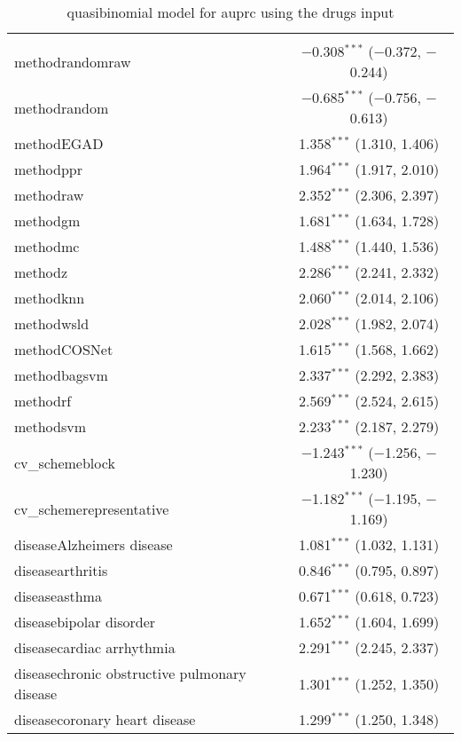 
\begin{table}[!htbp] \centering 
  \caption{quasibinomial model for auprc using the drugs input} 
  \label{} 
\begin{tabular}{@{\extracolsep{5pt}}lc} 
\\[-1.8ex]\hline 
\hline \\[-1.8ex] 
 methodrandomraw & $-$0.308$^{***}$ ($-$0.372, $-$0.244) \\ 
  methodrandom & $-$0.685$^{***}$ ($-$0.756, $-$0.613) \\ 
  methodEGAD & 1.358$^{***}$ (1.310, 1.406) \\ 
  methodppr & 1.964$^{***}$ (1.917, 2.010) \\ 
  methodraw & 2.352$^{***}$ (2.306, 2.397) \\ 
  methodgm & 1.681$^{***}$ (1.634, 1.728) \\ 
  methodmc & 1.488$^{***}$ (1.440, 1.536) \\ 
  methodz & 2.286$^{***}$ (2.241, 2.332) \\ 
  methodknn & 2.060$^{***}$ (2.014, 2.106) \\ 
  methodwsld & 2.028$^{***}$ (1.982, 2.074) \\ 
  methodCOSNet & 1.615$^{***}$ (1.568, 1.662) \\ 
  methodbagsvm & 2.337$^{***}$ (2.292, 2.383) \\ 
  methodrf & 2.569$^{***}$ (2.524, 2.615) \\ 
  methodsvm & 2.233$^{***}$ (2.187, 2.279) \\ 
  cv\_schemeblock & $-$1.243$^{***}$ ($-$1.256, $-$1.230) \\ 
  cv\_schemerepresentative & $-$1.182$^{***}$ ($-$1.195, $-$1.169) \\ 
  diseaseAlzheimers disease & 1.081$^{***}$ (1.032, 1.131) \\ 
  diseasearthritis & 0.846$^{***}$ (0.795, 0.897) \\ 
  diseaseasthma & 0.671$^{***}$ (0.618, 0.723) \\ 
  diseasebipolar disorder & 1.652$^{***}$ (1.604, 1.699) \\ 
  diseasecardiac arrhythmia & 2.291$^{***}$ (2.245, 2.337) \\ 
  diseasechronic obstructive pulmonary disease & 1.301$^{***}$ (1.252, 1.350) \\ 
  diseasecoronary heart disease & 1.299$^{***}$ (1.250, 1.348) \\ 

\end{tabular}
\end{table}
